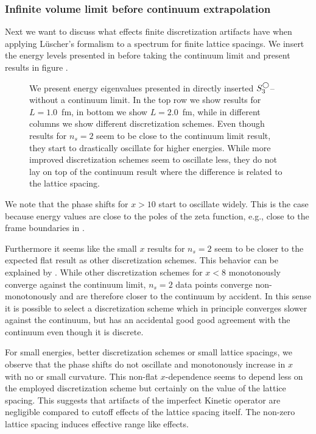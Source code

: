 \subsubsection{Infinite volume limit before continuum extrapolation}
Next we want to discuss what effects finite discretization artifacts have when applying Lüscher's formalism to a spectrum for finite lattice spacings.
We insert the energy levels presented in  before taking the continuum limit and present results in figure .

\begin{figure}[th]
    \scalebox{0.9}{}
    \caption{
        \label{fig:unimproved spherical}
        We present energy eigenvalues presented in  directly inserted $S^{\bigcirc}_3$--without a continuum limit.
        In the top row we show results for $L=1.0$~fm, in bottom we show $L=2.0$~fm, while in different columns we show different discretization schemes.
        Even though results for $n_s = 2$ seem to be close to the continuum limit result, they start to drastically oscillate for higher energies.
        While more improved discretization schemes seem to oscillate less, they do not lay on top of the continuum result where the difference is related to the lattice spacing.
    }
\end{figure}

We note that the phase shifts for $x > 10$ start to oscillate widely.
This is the case because energy values are close to the poles of the zeta function, e.g., close to the frame boundaries in .

Furthermore it seems like the small $x$ results for $n_s = 2$ seem to be closer to the expected flat result as other discretization schemes.
This behavior can be explained by .
While other discretization schemes for $x < 8$ monotonously converge against the continuum limit, $n_s = 2$ data points converge non-monotonously and are therefore closer to the continuum by accident.
In this sense it is possible to select a discretization scheme which in principle converges slower against the continuum, but has an accidental good good agreement with the continuum even though it is discrete.

For small energies, better discretization schemes or small lattice spacings, we observe that the phase shifts do not oscillate and monotonously increase in $x$ with no or small curvature.
This non-flat $x$-dependence seems to depend less on the employed discretization scheme but certainly on the value of the lattice spacing.
This suggests that artifacts of the imperfect Kinetic operator are negligible compared to cutoff effects of the lattice spacing itself.
The non-zero lattice spacing induces effective range like effects.

